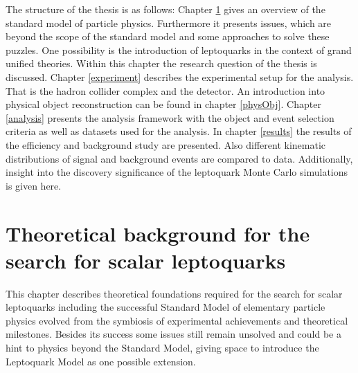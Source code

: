 The structure of the thesis is as follows: Chapter \ref{theory} gives an overview of the standard model of particle physics. Furthermore it presents issues, which are beyond the scope of the standard model and some approaches to solve these puzzles. One possibility is the introduction of leptoquarks in the context of grand unified theories. Within this chapter the research question of the thesis is discussed. Chapter \ref{experiment} describes the experimental setup for the analysis. That is the hadron collider complex {\LHC} and the {\ATLAS} detector. An introduction into physical object reconstruction can be found in chapter \ref{physObj}. Chapter \ref{analysis} presents the analysis framework with the object and event selection criteria as well as datasets used for the analysis. In chapter \ref{results} the results of the efficiency and background study are presented. Also different kinematic distributions of signal and background events are compared to data. Additionally, insight into the discovery significance of the leptoquark Monte Carlo simulations is given here. 
\chapter{Theoretical background for the search for scalar leptoquarks}\label{theory}
This chapter describes theoretical foundations required for the search for scalar leptoquarks including the successful Standard Model of elementary particle physics evolved from the symbiosis of experimental achievements and theoretical milestones. Besides its success some issues still remain unsolved and could be a hint to physics beyond the Standard Model, giving space to introduce the Leptoquark Model as one possible extension. 
